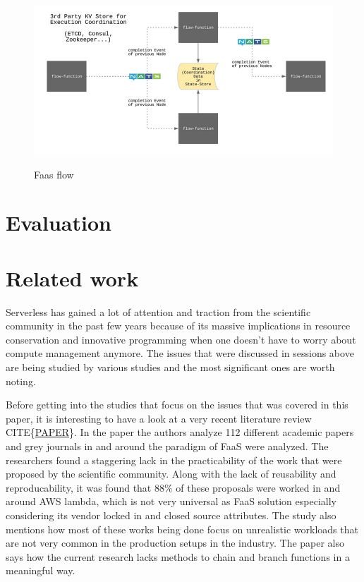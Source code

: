 \documentclass[12pt,titlepage]{article}
\begin{document}
\begin{figure}[!h]
    \caption{Faas flow}
    \centering
    \includegraphics[width=130mm]{./thesis_images/faas-flow.png}
    \label{fig:faas-flow}
\end{figure}
\section{Evaluation}
\label{sec:org71b6b8f}
\section{Related work}
\label{sec:org9acd2c8}
Serverless has gained a lot of attention and traction from the scientific
community in the past few years because of its massive implications in resource
conservation and innovative programming when one doesn't have to worry about
compute management anymore. The issues that were discussed in sessions above are
being studied by various studies and the most significant ones are worth noting.

Before getting into the studies that focus on the issues that was covered in
this paper, it is interesting to have a look at  a very recent literature review
CITE\{\href{https://arxiv.org/pdf/2004.03276.pdf}{PAPER}\}. In the paper the authors analyze 112 different academic papers
and grey journals in
and around the paradigm of FaaS were analyzed. The researchers found a
staggering lack in the practicability of the work that were proposed by the
scientific community. Along with the lack of reusability and reproducability, it
was found that 88\% of these proposals were worked in and around AWS lambda,
which is not very universal as FaaS solution especially considering its vendor
locked in and closed source attributes. The study also mentions how most of
these works being done focus on unrealistic workloads that are not very common
in the production setups in the industry. The paper also says how the current
research lacks methods to chain and branch functions in a meaningful way.
\end{document}
